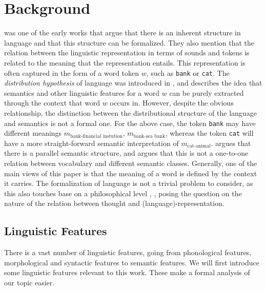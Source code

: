 \documentclass[a4paper,12pt,oneside,openright]{report}
\begin{document}
\chapter{Background}\label{section:Background} 

\cite{harris54} was one of the early works that argue that there is an inherent structure in language and that this structure can be formalized.
They also mention that the relation between the linguistic representation in terms of sounds and tokens is related to the meaning that the representation entails. 
This representation is often captured in the form of a word token $w$, such as \Verb#bank# or \Verb#cat#.
The \textit{distribution hypothesis} of language was introduced in \cite{harris54}, and describes the idea that semantics and other linguistic features for a word $w$ can be purely extracted through the context that word $w$ occurs in.
However, despite the obvious relationship, the distinction between the distributional structure of the language and semantics is not a formal one. 
For the above case, the token \Verb#bank# may have different meanings $m_\text{bank-financial instution}$, $m_\text{bank-sea bank}$, whereas the token \Verb#cat# will have a more straight-forward semantic interpretation of $m_\text{cat-animal}$.
\cite{harris54} argues that there is a parallel semantic structure, and argues that this is not a one-to-one relation between vocabulary and different semantic classes.
Generally, one of the main views of this paper is that the meaning of a word is defined by the context it carries.
The formalization of language is not a trivial problem to consider, as this also touches base on a philosophical level \cite{hegel17}, \cite{wittgenstein53}, posing the question on the nature of the relation between thought and (language)-representation.

\section{Linguistic Features}

There is a vast number of linguistic features, going from phonological features, morphological and syntactic features to semantic features.
We will first introduce some linguistic features relevant to this work.
These make a formal analysis of our topic easier.
\end{document}
